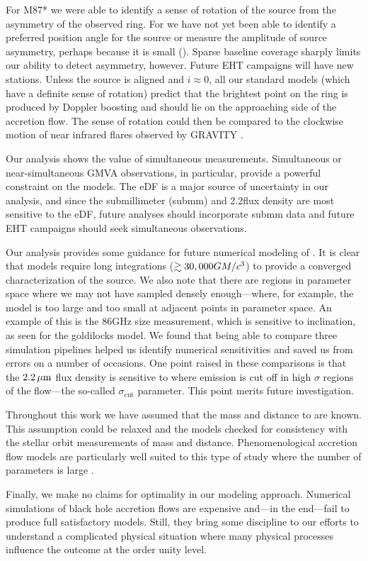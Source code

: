 For M87* we were able to identify a sense of rotation of the source from the asymmetry of the observed ring.  For \sgra we have not yet been able to identify a preferred position angle for the source or measure the amplitude of source asymmetry, perhaps because it is small ().  Sparse baseline coverage sharply limits our ability to detect asymmetry, however.  Future EHT campaigns will have new stations.  Unless the source is aligned and $i \approx 0$, all our standard models (which have a definite sense of rotation) predict that the brightest point on the ring is produced by Doppler boosting and should lie on the approaching side of the accretion flow.  The sense of rotation could then be compared to the clockwise motion of near infrared flares observed by GRAVITY \citep{2018A&A...618L..10G}.

Our analysis shows the value of simultaneous measurements.  Simultaneous or near-simultaneous GMVA observations, in particular, provide a powerful constraint on the models.  The eDF is a major source of uncertainty in our analysis, and since the submillimeter (submm) and 2.2\um flux density are most sensitive to the eDF, future analyses should incorporate submm data and future EHT campaigns should seek simultaneous observations.

Our analysis provides some guidance for future numerical modeling of \sgra.  It is clear that models require long integrations ($\gtrsim  30,000 GM/c^3$) to provide a converged characterization of the source.  We also note that there are regions in parameter space where we may not have sampled densely enough---where, for example, the model is too large and too small at adjacent points in parameter space.  An example of this is the 86GHz size measurement, which is sensitive to inclination, as seen for the goldilocks model.  We found that being able to compare three simulation pipelines helped us identify numerical sensitivities and saved us from errors on a number of occasions.  One point raised in these comparisons is that the $2.2\,\mu\mathrm{m}$ flux density is sensitive to where emission is cut off in high $\sigma$ regions of the flow---the so-called $\sigma_\mathrm{cut}$ parameter.  This point merits future investigation.

Throughout this work we have assumed that the mass and distance to \sgra are known.  This assumption could be relaxed and the models checked for consistency with the stellar orbit measurements of mass and distance.  Phenomenological accretion flow models are particularly well suited to this type of study where the number of parameters is large  \citep[e.g.,]{2009ApJ...697...45B}.

Finally, we make no claims for optimality in our modeling approach.  Numerical simulations of black hole accretion flows are expensive and---in the end---fail to produce full satisfactory models.  Still, they bring some discipline to our efforts to understand a complicated physical situation where many physical processes influence the outcome at the order unity level.
